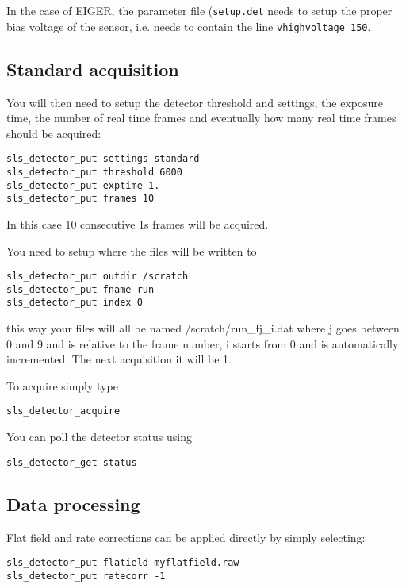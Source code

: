\documentclass{article}
\newcommand{\E}{EIGER\xspace}
\begin{document}
In the case of \E, the parameter file ({\tt{setup.det}} needs to setup the proper bias voltage of the sensor, i.e. needs to contain the line {\tt{vhighvoltage 150}}.

\subsection{Standard acquisition}

You will then need to setup the detector threshold and settings, the exposure time, the number of real time frames and eventually how many real time frames should be acquired:
\begin{verbatim}
sls_detector_put settings standard
sls_detector_put threshold 6000
sls_detector_put exptime 1.
sls_detector_put frames 10
\end{verbatim}
In this case 10 consecutive 1s frames will be acquired.

You need to setup where the files will be written to
\begin{verbatim}
sls_detector_put outdir /scratch
sls_detector_put fname run
sls_detector_put index 0
\end{verbatim}
this way your files will all be named /scratch/run\_fj\_i.dat where j goes between 0 and 9 and is relative to the frame number, i starts from 0 and is automatically incremented. The next acquisition it will be 1.


To acquire simply type
\begin{verbatim}
sls_detector_acquire
\end{verbatim}


You can poll the detector status using
\begin{verbatim}
sls_detector_get status 
\end{verbatim}


\subsection{Data processing}
Flat field and rate corrections can be applied directly by simply selecting:
\begin{verbatim}
sls_detector_put flatield myflatfield.raw
sls_detector_put ratecorr -1
\end{verbatim}
\end{document}
